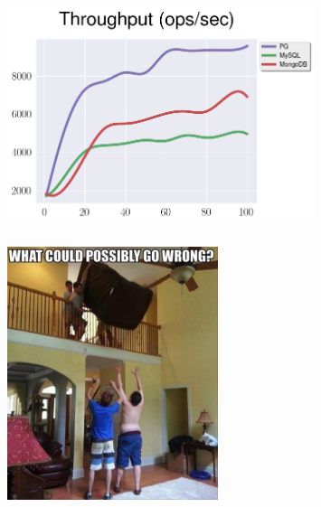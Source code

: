 \documentclass[usenames,dvipsnames, 18pt, compress, aspectratio=169]{beamer}
\begin{document}

\begin{frame}
    \frametitle{}
    \begin{center}
    \vspace{10pt}
    \begin{figure}
        \includegraphics[width=0.8\textwidth,center]{benchmarks/insert_throughput_wal_size.png}
    \end{figure}
    \end{center}
\end{frame}

\begin{frame}
    \frametitle{}
    \begin{center}
    \begin{figure}
        \includegraphics[width=0.55\textwidth,center]{wrong.jpg}
    \end{figure}
    \end{center}
\end{frame}
\end{document}
